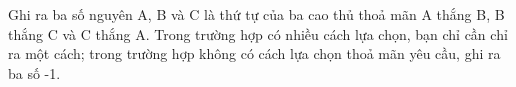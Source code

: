 Ghi ra ba số nguyên A, B và C là thứ tự của ba cao thủ thoả mãn A thắng B, B thắng C và C thắng A. Trong trường hợp có nhiều cách lựa chọn, bạn chỉ cần chỉ ra một cách; trong trường hợp không có cách lựa chọn thoả mãn yêu cầu, ghi ra ba số -1.  

\